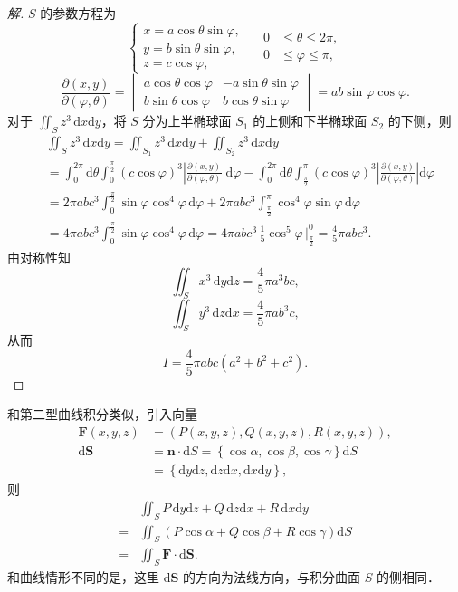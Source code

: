 \begin{proof}[解]
$S$ 的参数方程为
\[
\begin{cases}
x=a\cos\theta\sin\varphi,\\
y=b\sin\theta\sin\varphi,\\
z=c\cos\varphi,
\end{cases}
\quad
\begin{aligned}
0&\leqslant\theta\leqslant2\pi,\\
0&\leqslant\varphi\leqslant\pi,
\end{aligned}
\]
\[
\frac{\partial(x,y)}{\partial(\varphi,\theta)}=\begin{vmatrix}a\cos\theta\cos\varphi&-a\sin\theta\sin\varphi\\ b\sin\theta\cos\varphi&b\cos\theta\sin\varphi\end{vmatrix}=ab\sin\varphi\cos\varphi.
\]
对于 $\displaystyle\iint_{S}z^{3}\,\mathrm{d}x\mathrm{d}y$，将 $S$ 分为上半椭球面 $S_{1}$ 的上侧和下半椭球面 $S_{2}$ 的下侧，则
\[
\begin{aligned}
&\iint_{S}z^{3}\,\mathrm{d}x\mathrm{d}y=\iint_{S_{1}}z^{3}\,\mathrm{d}x\mathrm{d}y+\iint_{S_{2}}z^{3}\,\mathrm{d}x\mathrm{d}y\\
&=\int_{0}^{2\pi}\mathrm{d}\theta\int_{0}^{\frac{\pi}{2}}(c\cos\varphi)^{3}\left|\frac{\partial(x,y)}{\partial(\varphi,\theta)}\right|\mathrm{d}\varphi-\int_{0}^{2\pi}\mathrm{d}\theta\int_{\frac{\pi}{2}}^{\pi}(c\cos\varphi)^{3}\left|\frac{\partial(x,y)}{\partial(\varphi,\theta)}\right|\mathrm{d}\varphi\\
&=2\pi abc^{3}\int_{0}^{\frac{\pi}{2}}\sin\varphi\cos^{4}\varphi\,\mathrm{d}\varphi+2\pi abc^{3}\int_{\frac{\pi}{2}}^{\pi}\cos^{4}\varphi\sin\varphi\,\mathrm{d}\varphi\\
&=4\pi abc^{3}\int_{0}^{\frac{\pi}{2}}\sin\varphi\cos^{4}\varphi\,\mathrm{d}\varphi=4\pi abc^{3}\,\frac{1}{5}\cos^{5}\varphi\,\Big|_{\frac{\pi}{2}}^{0}=\frac{4}{5}\pi abc^{3}.
\end{aligned}
\]
由对称性知
\[
\iint_{S}x^{3}\,\mathrm{d}y\mathrm{d}z=\frac{4}{5}\pi a^{3}bc,
\]
\[
\iint_{S}y^{3}\,\mathrm{d}z\mathrm{d}x=\frac{4}{5}\pi ab^{3}c,
\]
从而
\[
I=\frac{4}{5}\pi abc\left(a^{2}+b^{2}+c^{2}\right).
\]
\end{proof}

和第二型曲线积分类似，引入向量
\[
\begin{aligned}
\bm{F}(x,y,z)&=\left(P(x,y,z),Q(x,y,z),R(x,y,z)\right),\\
\mathrm{d}\bm{S}&=\bm{n}\cdot\mathrm{d}S=\left\{\cos\alpha,\cos\beta,\cos\gamma\right\}\mathrm{d}S\\
&=\left\{\mathrm{d}y\mathrm{d}z,\mathrm{d}z\mathrm{d}x,\mathrm{d}x\mathrm{d}y\right\},
\end{aligned}
\]
则
\[
\begin{aligned}
&\iint_{S}P\,\mathrm{d}y\mathrm{d}z+Q\,\mathrm{d}z\mathrm{d}x+R\,\mathrm{d}x\mathrm{d}y\\
={}&\iint_{S}\left(P\cos\alpha+Q\cos\beta+R\cos\gamma\right)\mathrm{d}S\\
={}&\iint_{S}\bm{F}\cdot\mathrm{d}\bm{S}.
\end{aligned}
\]
和曲线情形不同的是，这里 $\mathrm{d}\bm{S}$ 的方向为法线方向，与积分曲面 $S$ 的侧相同．

